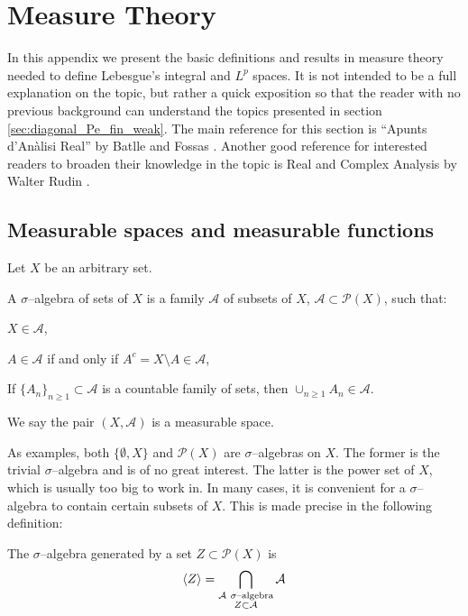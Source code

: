 
\section{Measure Theory} \label{ap:measure_theory}

In this appendix we present the basic definitions and results in measure theory
needed to define Lebesgue's integral and $L^p$ spaces. It is not intended to be
a full explanation on the topic, but rather a quick exposition so that the
reader with no previous background can understand the topics presented in
section \ref{sec:diagonal_Pe_fin_weak}. The main reference for this section is
``Apunts d'Anàlisi Real'' by Batlle and Fossas \cite{fossas2020real}. Another
good reference for interested readers to broaden their knowledge in the topic is
Real and Complex Analysis by Walter Rudin \cite{rudin1987real}.

\subsection{Measurable spaces and measurable functions}

Let $X$ be an arbitrary set.

\begin{definition*}
	A $\sigma$--algebra of sets of $X$ is a family $\mathcal{A}$ of subsets of $X$,
	$\mathcal{A} \subset \mathcal{P}(X)$, such that:
	\begin{enumeratedef}
		\item $X \in \mathcal{A}$,
		\item $A \in \mathcal{A}$ if and only if $A^c = X \setminus A \in \mathcal{A}$,
		\item If $\{ A_n \}_{n \geq 1} \subset \mathcal{A}$ is a countable
		family of sets, then $\cup_{n \geq 1} A_n \in \mathcal{A}$.
	\end{enumeratedef}
	We say the pair $(X, \mathcal{A})$ is a measurable space.
\end{definition*}

As examples, both $\{\emptyset, X\}$ and $\mathcal{P}(X)$ are $\sigma$--algebras
on $X$. The former is the trivial $\sigma$--algebra and is of no great interest.
The latter is the power set of $X$, which is usually too big to work in. In many
cases, it is convenient for a $\sigma$--algebra to contain certain subsets of
$X$. This is made precise in the following definition:

\begin{definition*}
	The $\sigma$--algebra generated by a set $Z \subset \mathcal{P}(X)$ is
	\[
		\langle Z \rangle = \bigcap_{\substack{\mathcal{A} \ \sigma\text{--algebra} \\ Z \subset \mathcal{A}}} \mathcal{A}	
	\]
\end{definition*}

